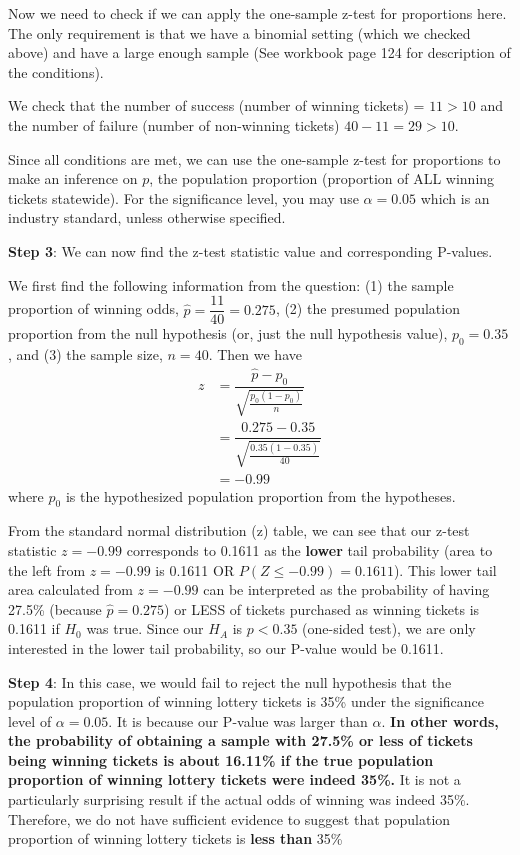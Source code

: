 \documentclass[12pt]{article}
\begin{document}
Now we need to check if we can apply the one-sample z-test for proportions here. The only requirement is that we have a binomial setting (which we checked above) and have a large enough sample (See workbook page 124 for description of the conditions).

We check that the number of success (number of winning tickets) = $11 > 10$ and the number of failure (number of non-winning tickets) $40 - 11 = 29 > 10$. 

Since all conditions are met, we can use the one-sample z-test for proportions to make an inference on $p$, the population proportion (proportion of ALL winning tickets statewide). For the significance level, you may use $\alpha = 0.05$ which is an industry standard, unless otherwise specified.

\noindent \textbf{Step 3}: We can now find the z-test statistic value and corresponding P-values. 

We first find the following information from the question: (1) the sample proportion of winning odds, $\hat{p} = \dfrac{11}{40} = 0.275$, (2) the presumed population proportion from the null hypothesis (or, just the null hypothesis value), $p_0 = 0.35$, and (3) the sample size, $n=40$. Then we have
\begin{align*}
z &= \dfrac{\hat{p} - p_0}{\sqrt{\frac{p_0 (1 - p_0)}{n}}} \\
&= \dfrac{0.275 - 0.35}{\sqrt{\frac{0.35 (1 - 0.35)}{40}}} \\
&= -0.99
\end{align*}
where $p_0$ is the hypothesized population proportion from the hypotheses.

From the standard normal distribution (z) table, we can see that our z-test statistic $z = -0.99$ corresponds to 0.1611 as the \textbf{lower} tail probability (area to the left from $z = -0.99$ is 0.1611 OR $P(Z \leq -0.99) = 0.1611$). This lower tail area calculated from $z = -0.99$ can be interpreted as the probability of having 27.5\% (because $\hat{p} = 0.275$) or LESS of tickets purchased as winning tickets is 0.1611 if $H_0$ was true. Since our $H_A$ is $p < 0.35$ (one-sided test), we are only interested in the lower tail probability, so our P-value would be 0.1611.

\noindent \textbf{Step 4}: In this case, we would fail to reject the null hypothesis that the population proportion of winning lottery tickets is 35\% under the significance level of $\alpha = 0.05$. It is because our P-value was larger than $\alpha$. \textbf{In other words, the probability of obtaining a sample with 27.5\% or less of tickets being winning tickets is about 16.11\% if the true population proportion of winning lottery tickets were indeed 35\%.} It is not a particularly surprising result if the actual odds of winning was indeed 35\%. Therefore, we do not have sufficient evidence to suggest that population proportion of winning lottery tickets is \textbf{less than} 35\%
\end{document}
